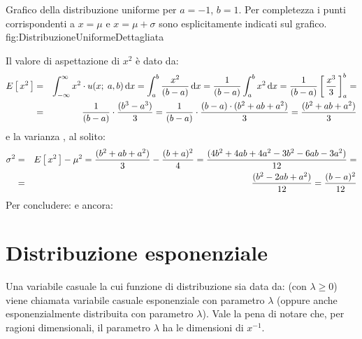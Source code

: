 \panelfig
{}
{Grafico della distribuzione uniforme per $a = -1$, $b = 1$.
Per completezza i punti corrispondenti a $x = \mu$ e $x = \mu + \sigma$
sono esplicitamente indicati sul grafico.}
{fig:DistribuzioneUniformeDettagliata}

Il valore di aspettazione di $x^2$ \`e dato da:
\begin{eqnarray*}
\expect{x^2} & = &
\dintegral{x^2 \cdot \uniformpdf{x}{a, b}}{x}{-\infty}{\infty} =
\dintegral{\frac{x^2}{(b-a)}}{x}{a}{b} =
\frac{1}{(b-a)} \dintegral{x^2}{x}{a}{b} =
\frac{1}{(b-a)}\eval{\frac{x^3}{3}}{a}{b} =\\
&=& \frac{1}{(b-a)}\cdot \frac{(b^3-a^3)}{3} =
\frac{1}{(b-a)}\cdot \frac{(b-a)\cdot(b^2 + ab + a^2)}{3} =
\frac{(b^2 + ab + a^2)}{3}
\end{eqnarray*}
e la varianza , al solito:
\begin{eqnarray*}
\sigma^2 & = &
\expect{x^2} - \mu^2 =
\frac{(b^2 + ab + a^2)}{3} -\frac{(b+a)^2}{4} =
\frac{(4b^2 + 4ab + 4a^2 - 3b^2 -6ab - 3 a^2)}{12} =\\
&=& \frac{(b^2-2ab+a^2)}{12} =
\frac{(b-a)^2}{12}
\end{eqnarray*}
Per concludere:
e ancora:

\begin{exemplify}


\end{exemplify}


\section{Distribuzione esponenziale}

Una variabile casuale la cui funzione di
distribuzione sia data da:
(con $\lambda \geq 0$) viene chiamata variabile casuale esponenziale con
parametro $\lambda$ (oppure anche esponenzialmente distribuita con parametro
$\lambda$).
Vale la pena di notare che, per ragioni dimensionali, il parametro
$\lambda$ ha le dimensioni di $x^{-1}$.

